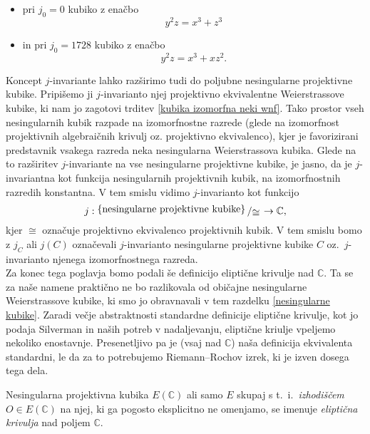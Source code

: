 \documentclass[mat1]{fmfdelo}
\newcommand{\C}{\mathbb C}
\newcommand{\bigslant}[2]{{\raisebox{.2em}{$#1$}\left/\raisebox{-.2em}{$#2$}\right.}}
\theoremstyle{definition}
\begin{document}
\begin{itemize}
    \item pri $j_0 = 0$ kubiko z enačbo 
    \[
        y^2z = x^3 + z^3
    \]
    \item in pri $j_0 = 1728$ kubiko z enačbo
    \[
        y^2z = x^3 + xz^2.
    \]
\end{itemize}

Koncept $j$-invariante lahko razširimo tudi do poljubne nesingularne projektivne kubike. Pripišemo ji $j$-invarianto njej projektivno ekvivalentne Weierstrassove kubike, ki nam jo zagotovi trditev \ref{kubika izomorfna neki wnf}. Tako prostor vseh nesingularnih kubik razpade na izomorfnostne razrede (glede na izomorfnost projektivnih algebraičnih krivulj oz. projektivno ekvivalenco), kjer je favorizirani predstavnik vsakega razreda neka nesingularna Weierstrassova kubika. Glede na to razširitev $j$-invariante na vse nesingularne projektivne kubike, je jasno, da je $j$-invariantna kot funkcija nesingularnih projektivnih kubik, na izomorfnostnih razredih konstantna. V tem smislu vidimo $j$-invarianto kot funkcijo
\[
    j: \bigslant{\{\text{nesingularne projektivne kubike}\}}{\cong} \to \C,
\]
kjer $\cong$ označuje projektivno ekvivalenco projektivnih kubik. V tem smislu bomo z $j_C$ ali $j(C)$ označevali $j$-invarianto nesingularne projektivne kubike $C$ oz.\ $j$-invarianto njenega izomorfnostnega razreda.
\\

Za konec tega poglavja bomo podali še definicijo eliptične krivulje nad $\C$. Ta se za naše namene praktično ne bo razlikovala od običajne nesingularne Weierstrassove kubike, ki smo jo obravnavali v tem razdelku \ref{nesingularne kubike}. Zaradi večje abstraktnosti standardne definicije eliptične krivulje, kot jo podaja Silverman \cite[III. \S 3.]{Silverman} in naših potreb v nadaljevanju, eliptične kriulje vpeljemo nekoliko enostavnje. Presenetljivo pa je (vsaj nad $\C$) naša definicija ekvivalenta standardni, le da za to potrebujemo Riemann--Rochov izrek, ki je izven dosega tega dela.

\begin{definicija}
    Nesingularna projektivna kubika $E(\C)$ ali samo $E$ skupaj s t.~i.\ \emph{izhodiščem} $O \in E(\C)$ na njej, ki ga pogosto eksplicitno ne omenjamo, se imenuje \emph{eliptična krivulja} nad poljem $\C$. 
\end{definicija}
\end{document}
